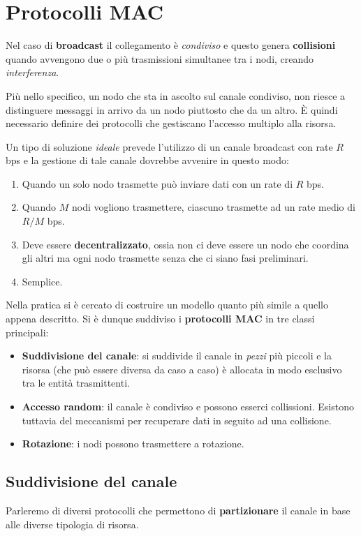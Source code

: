 \section{Protocolli MAC}
Nel caso di \textbf{broadcast} il collegamento è \emph{condiviso} e
questo genera \textbf{collisioni} quando avvengono due o più 
trasmissioni simultanee tra i nodi, creando \emph{interferenza}.

Più nello specifico, un nodo che sta in ascolto sul canale condiviso,
non riesce a distinguere messaggi in arrivo da un nodo piuttosto che
da un altro. \`E quindi necessario definire dei protocolli che 
gestiscano l'accesso multiplo alla risorsa.

Un tipo di soluzione \emph{ideale} prevede l'utilizzo di un canale 
broadcast con rate $R$ bps e la gestione di tale canale dovrebbe 
avvenire in questo modo:
\begin{enumerate}
	\item Quando un solo nodo trasmette può inviare dati con un rate 
		di $R$ bps.
	\item Quando $M$ nodi vogliono trasmettere, ciascuno trasmette ad
		un rate medio di $R / M$ bps.
	\item Deve essere \textbf{decentralizzato}, ossia non ci deve
		essere un nodo che coordina gli altri ma ogni nodo trasmette
		senza che ci siano fasi preliminari.
	\item Semplice.
\end{enumerate}
Nella pratica si è cercato di costruire un modello quanto più simile
a quello appena descritto. Si è dunque suddiviso i \textbf{protocolli
MAC} in tre classi principali:
\begin{itemize}
	\item \textbf{Suddivisione del canale}: si suddivide il canale
		in \emph{pezzi} più piccoli e la risorsa (che può essere 
		diversa da caso a caso) è allocata in modo esclusivo tra le
		entità trasmittenti.
	\item \textbf{Accesso random}: il canale è condiviso e possono 
		esserci collissioni. Esistono tuttavia del meccanismi per
		recuperare dati in seguito ad una collisione.
	\item \textbf{Rotazione}: i nodi possono trasmettere a rotazione.
\end{itemize}

\subsection{Suddivisione del canale}
Parleremo di diversi protocolli che permettono di \textbf{partizionare}
il canale in base alle diverse tipologia di risorsa.

